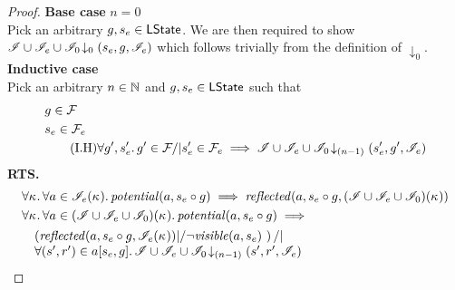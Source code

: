 \begin{lemma}
\begin{proof}
\noindent\textbf{Base case }$n=0$\\
Pick an arbitrary $g, s_e \in \textsf{LState}$. We are then required to show	$\mathscr{I} \cup \mathscr{I}_e \cup \mathscr{I}_0 \!\downarrow_{0} \left(s_e, g, \mathscr{I}_e\right)$ which follows trivially from the definition of $\downarrow_0$.\\


\noindent\textbf{Inductive case }\\
Pick an arbitrary $n \in \mathbb{N}$ and $g, s_e \in \textsf{LState}$ such that
%
\begin{align}
	& g \in  \mathcal{F}_{} \label{LEC:Ass1}\\
	& s_e \in \mathcal{F}_{e} \label{LEC:Ass2}\\
	& \tag{I.H} \forall g', s_e'.\,  g' \in \mathcal{F}_{} /| s'_e \in \mathcal{F}_{e} \implies \mathscr{I} \cup \mathscr{I}_{e} \cup \mathscr{I}_0 \!\downarrow_{(n-1)} \left(s_e', g', \mathscr{I}_{e}\right) \label{LEC:IH}
\end{align}
%
\textbf{RTS.}
%
\begin{align}
	& \for{\ca{}}\for{a \in \lmod_e (\ca{})} \m{potential}(a, s_e \composeL g) \implies
	\m{reflected}(a, s_e \composeL g, (\lmod \cup \lmod_e \cup \lmod_0)(\ca{}))\label{LEC:Goal1}\\
	& \for{\ca{}}\for{a \in (\lmod \cup \lmod_e \cup \lmod_0)(\ca{})} \m{potential}(a, s_e \composeL g) \implies \nonumber \\
	& \quad
	\begin{array}{@{} l @{}}
		\left(\m{reflected}(a,s_e \composeL g, \lmod_e(\ca{})) |/ \neg\m{visible}(a, s_e) \ \right) /| \\
		\for{(s', r') \in a[s_e, g]} \extendsAMUpto{\lmod \cup \lmod_e \cup \lmod_0}{(n-1)}{s'}{r'}{\lmod_e}
 	\end{array} 
  \label{LEC:Goal3}
\end{align}
%
%


\end{proof}
\end{lemma}
